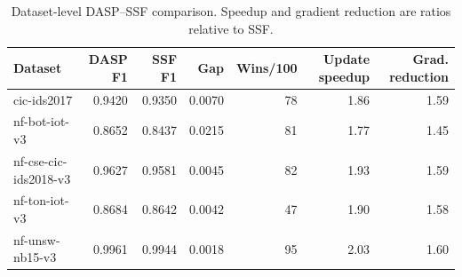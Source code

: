 \begin{table}[t]
\caption{Mean Macro-F1 by dataset and method over the confirmation matrix.}
\label{tab:dataset-method-f1}
\centering
{}
\end{table}

\begin{table}[t]
\caption{Dataset-level DASP--SSF comparison. Speedup and gradient reduction are ratios relative to SSF.}
\label{tab:dataset-cost-detail}
\centering
\begin{tabular}{lrrrrrr}
\toprule
Dataset & DASP F1 & SSF F1 & Gap & Wins/100 & Update speedup & Grad. reduction\\
\midrule
cic-ids2017 & 0.9420 & 0.9350 & 0.0070 & 78 & 1.86 & 1.59\\
nf-bot-iot-v3 & 0.8652 & 0.8437 & 0.0215 & 81 & 1.77 & 1.45\\
nf-cse-cic-ids2018-v3 & 0.9627 & 0.9581 & 0.0045 & 82 & 1.93 & 1.59\\
nf-ton-iot-v3 & 0.8684 & 0.8642 & 0.0042 & 47 & 1.90 & 1.58\\
nf-unsw-nb15-v3 & 0.9961 & 0.9944 & 0.0018 & 95 & 2.03 & 1.60\\
\bottomrule
\end{tabular}
\end{table}

